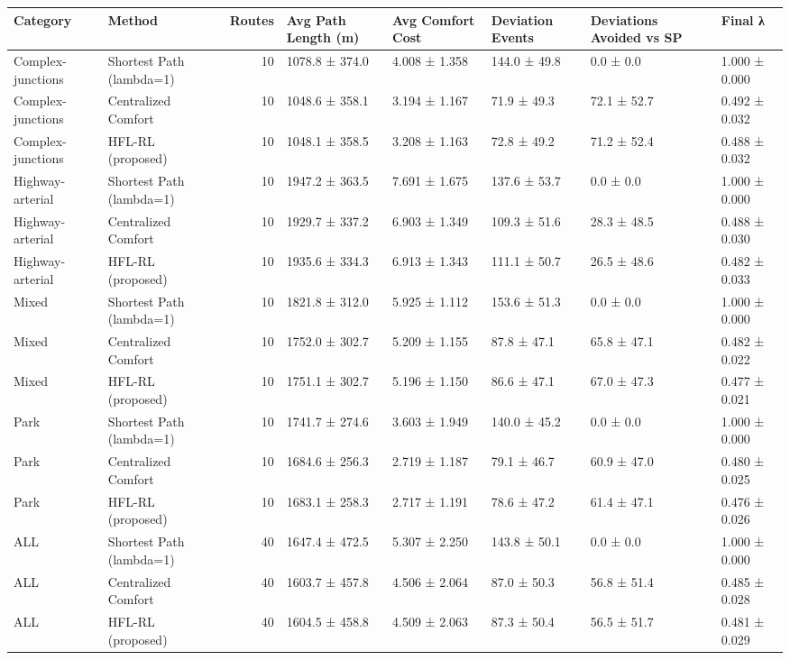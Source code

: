 \begin{tabular}{llrlllll}
\toprule
Category & Method & Routes & Avg Path Length (m) & Avg Comfort Cost & Deviation Events & Deviations Avoided vs SP & Final λ \\
\midrule
Complex-junctions & Shortest Path (lambda=1) & 10 & 1078.8 ± 374.0 & 4.008 ± 1.358 & 144.0 ± 49.8 & 0.0 ± 0.0 & 1.000 ± 0.000 \\
Complex-junctions & Centralized Comfort & 10 & 1048.6 ± 358.1 & 3.194 ± 1.167 & 71.9 ± 49.3 & 72.1 ± 52.7 & 0.492 ± 0.032 \\
Complex-junctions & HFL-RL (proposed) & 10 & 1048.1 ± 358.5 & 3.208 ± 1.163 & 72.8 ± 49.2 & 71.2 ± 52.4 & 0.488 ± 0.032 \\
Highway-arterial & Shortest Path (lambda=1) & 10 & 1947.2 ± 363.5 & 7.691 ± 1.675 & 137.6 ± 53.7 & 0.0 ± 0.0 & 1.000 ± 0.000 \\
Highway-arterial & Centralized Comfort & 10 & 1929.7 ± 337.2 & 6.903 ± 1.349 & 109.3 ± 51.6 & 28.3 ± 48.5 & 0.488 ± 0.030 \\
Highway-arterial & HFL-RL (proposed) & 10 & 1935.6 ± 334.3 & 6.913 ± 1.343 & 111.1 ± 50.7 & 26.5 ± 48.6 & 0.482 ± 0.033 \\
Mixed & Shortest Path (lambda=1) & 10 & 1821.8 ± 312.0 & 5.925 ± 1.112 & 153.6 ± 51.3 & 0.0 ± 0.0 & 1.000 ± 0.000 \\
Mixed & Centralized Comfort & 10 & 1752.0 ± 302.7 & 5.209 ± 1.155 & 87.8 ± 47.1 & 65.8 ± 47.1 & 0.482 ± 0.022 \\
Mixed & HFL-RL (proposed) & 10 & 1751.1 ± 302.7 & 5.196 ± 1.150 & 86.6 ± 47.1 & 67.0 ± 47.3 & 0.477 ± 0.021 \\
Park & Shortest Path (lambda=1) & 10 & 1741.7 ± 274.6 & 3.603 ± 1.949 & 140.0 ± 45.2 & 0.0 ± 0.0 & 1.000 ± 0.000 \\
Park & Centralized Comfort & 10 & 1684.6 ± 256.3 & 2.719 ± 1.187 & 79.1 ± 46.7 & 60.9 ± 47.0 & 0.480 ± 0.025 \\
Park & HFL-RL (proposed) & 10 & 1683.1 ± 258.3 & 2.717 ± 1.191 & 78.6 ± 47.2 & 61.4 ± 47.1 & 0.476 ± 0.026 \\
ALL & Shortest Path (lambda=1) & 40 & 1647.4 ± 472.5 & 5.307 ± 2.250 & 143.8 ± 50.1 & 0.0 ± 0.0 & 1.000 ± 0.000 \\
ALL & Centralized Comfort & 40 & 1603.7 ± 457.8 & 4.506 ± 2.064 & 87.0 ± 50.3 & 56.8 ± 51.4 & 0.485 ± 0.028 \\
ALL & HFL-RL (proposed) & 40 & 1604.5 ± 458.8 & 4.509 ± 2.063 & 87.3 ± 50.4 & 56.5 ± 51.7 & 0.481 ± 0.029 \\
\bottomrule
\end{tabular}
